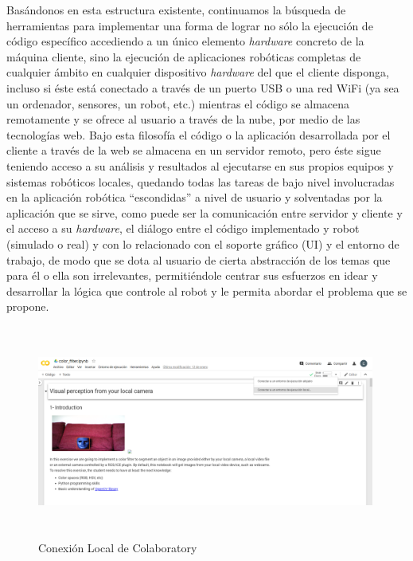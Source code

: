 Basándonos en esta estructura existente, continuamos la búsqueda de herramientas para implementar una forma de lograr no sólo la ejecución de código específico accediendo a un único elemento \textit{hardware} concreto de la máquina cliente, sino la ejecución de aplicaciones robóticas completas de cualquier ámbito en cualquier dispositivo \textit{hardware} del que el cliente disponga, incluso si éste está conectado a través de un puerto USB o una red WiFi (ya sea un ordenador, sensores, un robot, etc.) mientras el código se almacena remotamente y se ofrece al usuario a través de la nube, por medio de las tecnologías web. Bajo esta filosofía el código o la aplicación desarrollada por el cliente a través de la web se almacena en un servidor remoto, pero éste sigue teniendo acceso a su análisis y resultados al ejecutarse en sus propios equipos y sistemas robóticos locales, quedando todas las tareas de bajo nivel involucradas en la aplicación robótica ``escondidas'' a nivel de usuario y solventadas por la aplicación que se sirve, como puede ser la comunicación entre servidor y cliente y el acceso a su \textit{hardware}, el diálogo entre el código implementado y robot (simulado o real) y con lo relacionado con el soporte gráfico (UI) y el entorno de trabajo, de modo que se dota al usuario de cierta abstracción de los temas que para él o ella son irrelevantes, permitiéndole centrar sus esfuerzos en idear y desarrollar la lógica que controle al robot y le permita abordar el problema que se propone.

\begin{figure}[!htbp]  \centering\noindent
    \includegraphics[width=0.99\textwidth,height=7cm]{figures/colab.png}
    \caption{Conexión Local de Colaboratory}
    \label{colab}
\end{figure}
